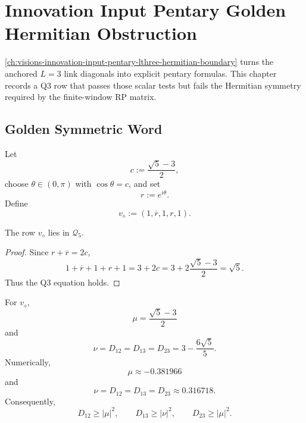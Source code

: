 \chapter{Innovation Input Pentary Golden Hermitian Obstruction}
\label{ch:visions-innovation-input-pentary-golden-hermitian-obstruction}

\autoref{ch:visions-innovation-input-pentary-lthree-hermitian-boundary}
turns the anchored $L=3$ link diagonals into explicit pentary formulas.
This chapter records a Q3 row that passes those scalar tests but fails the
Hermitian symmetry required by the finite-window RP matrix.

\section{Golden Symmetric Word}
\label{sec:innovation-input-pentary-golden-symmetric-word}

\begin{definition}
\label{def:innovation-input-golden-symmetric-pentary-word}
Let
$$
c:=\frac{\sqrt5-3}{2},
$$
choose $\theta\in(0,\pi)$ with $\cos\theta=c$, and set
$$
r:=e^{i\theta}.
$$
Define
$$
v_\diamond:=(1,\overline r,1,r,1).
$$
\end{definition}

\begin{theorem}
\label{thm:innovation-input-golden-symmetric-row-qthree}
The row $v_\diamond$ lies in $\mathcal Q_5$.
\end{theorem}

\begin{proof}
Since $r+\overline r=2c$,
$$
1+\overline r+1+r+1
=
3+2c
=
3+2\frac{\sqrt5-3}{2}
=
\sqrt5.
$$
Thus the Q3 equation holds.
\end{proof}

\begin{theorem}
\label{thm:innovation-input-golden-symmetric-link-diagonal-filter}
For $v_\diamond$,
$$
\mu=\frac{\sqrt5-3}{2}
$$
and
$$
\nu=D_{12}=D_{13}=D_{23}
=
3-\frac{6\sqrt5}{5}.
$$
Numerically,
$$
\mu\approx -0.381966
$$
and
$$
\nu=D_{12}=D_{13}=D_{23}\approx0.316718.
$$
Consequently,
$$
D_{12}\ge|\mu|^2,
\qquad
D_{13}\ge|\nu|^2,
\qquad
D_{23}\ge|\mu|^2.
$$
\end{theorem}

